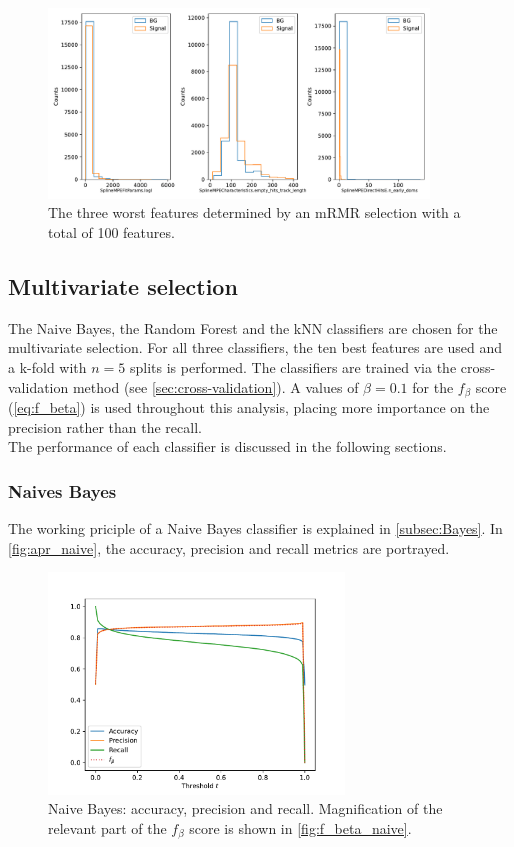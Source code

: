 \begin{figure}
    \centering
    \includegraphics[width=0.9\textwidth]{content/plots/worst_3_features.pdf}
    \caption{The three worst features determined by an mRMR selection with a total of 100 features.}
    \label{fig:worst_features}
\end{figure}

\subsection{Multivariate selection}
The Naive Bayes, the Random Forest and the kNN classifiers are chosen for the multivariate selection. For all three classifiers, the ten best features are used and a k-fold with $n=\num{5}$ splits is performed. The classifiers are 
trained via the cross-validation method (see \autoref{sec:cross-validation}). A values of $\beta=0.1$ for the $f_{\beta}$ score (\eqref{eq:f_beta}) is used throughout this analysis, placing more importance on the precision rather 
than the recall. \\
The performance of each classifier is discussed in the following sections.

\subsubsection{Naives Bayes}
The working priciple of a Naive Bayes classifier is explained in \autoref{subsec:Bayes}. In \autoref{fig:apr_naive}, the accuracy, precision and recall metrics are portrayed.
\begin{figure}
    \centering
    \includegraphics[width=0.7\textwidth]{content/plots/apr_naive.pdf}
    \caption{Naive Bayes: accuracy, precision and recall. Magnification of the relevant part of the $f_{\beta}$ score is shown in \autoref{fig:f_beta_naive}.} 
    \label{fig:apr_naive}
\end{figure}


